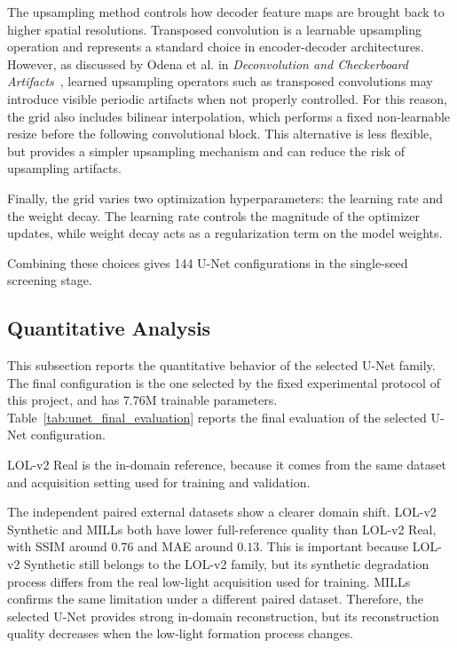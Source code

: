 The upsampling method controls how decoder feature maps are brought back to higher spatial resolutions. Transposed convolution is a learnable upsampling operation and represents a standard choice in encoder-decoder architectures. However, as discussed by Odena et al. in \emph{Deconvolution and Checkerboard Artifacts}~\cite{odena2016deconvolution}, learned upsampling operators such as transposed convolutions may introduce visible periodic artifacts when not properly controlled. For this reason, the grid also includes bilinear interpolation, which performs a fixed non-learnable resize before the following convolutional block. This alternative is less flexible, but provides a simpler upsampling mechanism and can reduce the risk of upsampling artifacts.

Finally, the grid varies two optimization hyperparameters: the learning rate and the weight decay. The learning rate controls the magnitude of the optimizer updates, while weight decay acts as a regularization term on the model weights.

Combining these choices gives 144 U-Net configurations in the single-seed screening stage.

\subsection{Quantitative Analysis}

This subsection reports the quantitative behavior of the selected U-Net family. The final configuration is the one selected by the fixed experimental protocol of this project, and has $7.76$M trainable parameters. Table~\ref{tab:unet_final_evaluation} reports the final evaluation of the selected U-Net configuration.



LOL-v2 Real is the in-domain reference, because it comes from the same dataset and acquisition setting used for training and validation.

The independent paired external datasets show a clearer domain shift. LOL-v2 Synthetic and MILLs both have lower full-reference quality than LOL-v2 Real, with SSIM around $0.76$ and MAE around $0.13$. This is important because LOL-v2 Synthetic still belongs to the LOL-v2 family, but its synthetic degradation process differs from the real low-light acquisition used for training. MILLs confirms the same limitation under a different paired dataset. Therefore, the selected U-Net provides strong in-domain reconstruction, but its reconstruction quality decreases when the low-light formation process changes.

